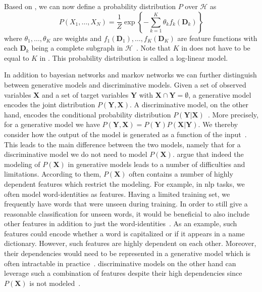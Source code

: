 \bigskip

Based on , we can now define a \gls{probability distribution} $P$ over $\mathcal{H}$ as
\begin{equation}
  \label{equ:log-linear-model}
  P\left(X_1,\dots,X_N\right) = \frac{1}{Z}\exp\left\{-\sum_{k=1}^K \theta_k f_k\left(\mathbf{D}_k\right)\right\}
\end{equation}
where $\theta_1,\dots,\theta_K$ are weights and $f_1(\mathbf{D}_1),\dots,f_K(\mathbf{D}_K)$ are \glspl{feature function} with each $\mathbf{D}_k$ being a complete subgraph in $\mathcal{H}$~\citep{koller2009probabilistic}.
Note that $K$ in  does not have to be equal to $K$ in .
This \gls{probability distribution} is called a \gls{log-linear model}.

\bigskip

In addition to \glspl{bayesian network} and \glspl{markov network} we can further distinguish between \glspl{generative model} and \glspl{discriminative model}.
Given a set of \glspl{observed variable} $\mathbf{X}$ and a set of \glspl{target variable} $\mathbf{Y}$ with $\mathbf{X}\cap\mathbf{Y}=\emptyset$, a \gls{generative model} encodes the \gls{joint distribution} $P(\mathbf{Y},\mathbf{X})$.
A \gls{discriminative model}, on the other hand, encodes the \gls{conditional probability distribution} $P(\mathbf{Y}|\mathbf{X})$~\citep{koller2009probabilistic}.
More precisely, for a \gls{generative model} we have $P(\mathbf{Y},\mathbf{X})=P(\mathbf{Y})P(\mathbf{X}|\mathbf{Y})$.
We thereby consider how the output of the model is generated as a function of the input~\citep{sutton2010introduction}.
This leads to the main difference between the two models, namely that for a \gls{discriminative model} we do not need to model $P(\mathbf{X})$.
\citet{sutton2010introduction} argue that indeed the modeling of $P(\mathbf{X})$ in \glspl{generative model} leads to a number of difficulties and limitations.
According to them, $P(\mathbf{X})$ often contains a number of highly dependent features which restrict the modeling.
For example, in \gls{nlp} tasks, we often model word-identities as features.
Having a limited training set, we frequently have words that were unseen during training.
In order to still give a reasonable classification for unseen words, it would be beneficial to also include other features in addition to just the word-identities~\citep{sutton2010introduction}.
As an example, such features could encode whether a word is capitalized or if it appears in a name dictionary.
However, such features are highly dependent on each other.
Moreover, their dependencies would need to be represented in a \gls{generative model} which is often intractable in practice~\citep{sutton2010introduction}.
\Glspl{discriminative model} on the other hand can leverage such a combination of features despite their high dependencies since $P(\mathbf{X})$ is not modeled~\citep{koller2009probabilistic}.

